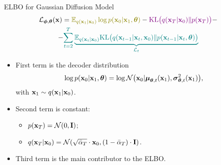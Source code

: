 \documentclass{beamer}
\begin{document}
\begin{frame}{ELBO for Gaussian Diffusion Model}
        \vspace{-0.5cm}
        \begin{multline*}
            \cL_{\bphi, \btheta}(\bx) =  {\color{olive}\bbE_{q(\bx_1 | \bx_0)} \log p(\bx_0 | \bx_1, \btheta)} - {\color{violet}\KL\bigl(q(\bx_T | \bx_0) \| p(\bx_T)\bigr)} - \\
            - {\color{teal}\sum_{t=2}^T \underbrace{ \bbE_{q(\bx_t | \bx_0)} \KL \bigl(q(\bx_{t-1} | \bx_t, \bx_0) \| p(\bx_{t - 1} | \bx_t, \btheta )\bigr)}_{\cL_t}}
        \end{multline*}
        \vspace{-0.5cm}
    \eqpause
    \begin{itemize}
        \item {\color{olive}First term} is the decoder distribution
        \[
            \log p(\mathbf{x}_0 | \mathbf{x}_1, \boldsymbol{\theta}) = \log \mathcal{N} \bigl(\mathbf{x}_0 | \boldsymbol{\mu}_{\boldsymbol{\theta}, t}(\mathbf{x}_1), \boldsymbol{\sigma}_{\boldsymbol{\theta}, t}^2(\mathbf{x}_1)\bigr),
        \] 
        with $\mathbf{x}_1 \sim q(\mathbf{x}_1 | \mathbf{x}_0)$.
        \eqpause
        \item {\color{violet}Second term} is constant: 
        \begin{itemize}
            \item $p(\mathbf{x}_T) = \mathcal{N}(0, \mathbf{I})$;
            \item $q(\mathbf{x}_T | \mathbf{x}_0) = \mathcal{N}(\sqrt{\bar{\alpha}_T} \cdot \mathbf{x}_0, (1 - \bar{\alpha}_T) \cdot \mathbf{I})$.
        \end{itemize}
        \eqpause
        \item {\color{teal}Third term} is the main contributor to the ELBO.
    \end{itemize}
\end{frame}
\end{document}
